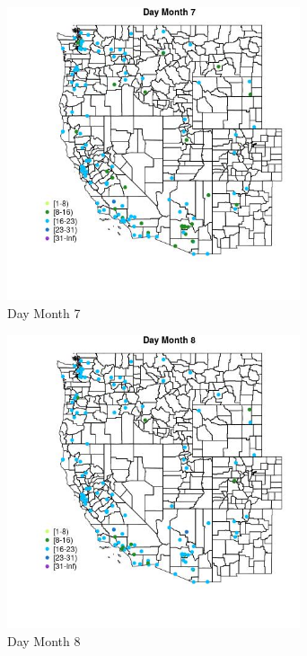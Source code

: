 \begin{figure} 
\centering  
\includegraphics[width=0.77\textwidth]{Code_Outputs/Report_ML_input_PM25_Step4_part_e_de_duplicated_aves_MapObsMo7Day.jpg} 
\caption{\label{fig:Report_ML_input_PM25_Step4_part_e_de_duplicated_avesMapObsMo7Day}Day Month 7} 
\end{figure} 
 

\begin{figure} 
\centering  
\includegraphics[width=0.77\textwidth]{Code_Outputs/Report_ML_input_PM25_Step4_part_e_de_duplicated_aves_MapObsMo8Day.jpg} 
\caption{\label{fig:Report_ML_input_PM25_Step4_part_e_de_duplicated_avesMapObsMo8Day}Day Month 8} 
\end{figure} 
 

